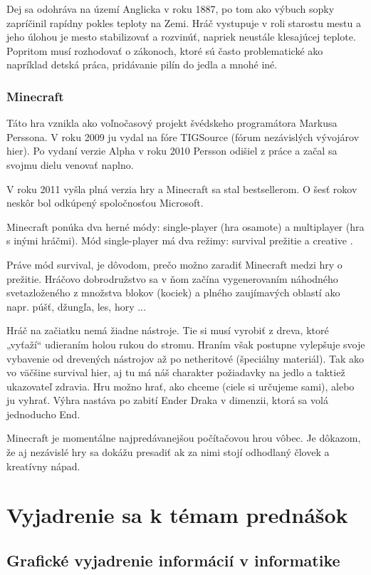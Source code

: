 \documentclass[10pt,oneoside,slovak,a4paper]{article}
\begin{document}
Dej sa odohráva na území Anglicka v roku 1887, po tom ako výbuch sopky zapríčinil rapídny pokles teploty na Zemi.
Hráč vystupuje v roli starostu mestu a jeho úlohou je mesto stabilizovať a rozvinúť, napriek neustále klesajúcej teplote. Popritom  musí rozhodovať o zákonoch, ktoré sú často problematické ako napríklad detská práca, pridávanie pilín do jedla a mnohé iné.\cite{Salo}\cite{FW}


\subsubsection{Minecraft}
Táto hra vznikla ako voľnočasový projekt švédskeho programátora Markusa Perssona. V roku 2009 ju vydal na fóre TIGSource (fórum nezávislých vývojárov hier). Po vydaní verzie Alpha v roku 2010 Persson odišiel z práce a začal sa svojmu dielu venovať naplno.\cite{RB}

V roku 2011 vyšla plná verzia hry a Minecraft sa stal bestsellerom. O šesť rokov neskôr bol odkúpený spoločnosťou Microsoft.\cite{RB}

Minecraft ponúka dva herné módy: single-player (hra osamote) a multiplayer (hra s inými hráčmi).
Mód single-player má dva režimy: survival prežitie a creative .

Práve mód survival, je dôvodom, prečo možno zaradiť Minecraft medzi hry o prežitie.
Hráčovo dobrodružstvo sa v ňom začína vygenerovaním náhodného sveta\cite{Duncan}zloženého z množstva blokov (kociek) a plného zaujímavých oblastí ako napr. púšť, džungľa, les, hory ...

Hráč na začiatku  nemá žiadne nástroje. Tie si musí vyrobiť z dreva, ktoré „vyťaží“ udieraním holou rukou do stromu\cite{RB}. Hraním však postupne vylepšuje svoje vybavenie od drevených nástrojov až po netheritové (špeciálny materiál). Tak ako vo väčšine survival hier, aj tu má náš charakter požiadavky na jedlo a taktiež ukazovateľ zdravia. 
Hru možno hrať, ako chceme (ciele si určujeme sami), alebo ju vyhrať. Výhra nastáva po zabití Ender Draka v dimenzii, ktorá sa volá jednoducho End.

Minecraft je momentálne najpredávanejšou počítačovou hrou vôbec.  Je dôkazom, že aj nezávislé hry sa dokážu presadiť ak za nimi stojí odhodlaný človek a kreatívny nápad.

\section{Vyjadrenie sa k témam prednášok} 

\subsection{Grafické vyjadrenie informácií v informatike}
\end{document}
